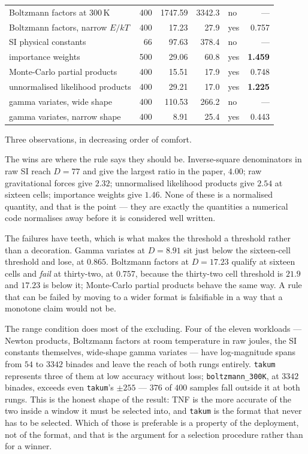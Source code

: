\begin{table}[htbp]
\begin{tabular}{lrrrlr}
Boltzmann factors at $300$\,K & 400 & 1747.59 & 3342.3 & no & --- \\
Boltzmann factors, narrow $E/kT$ & 400 & 17.23 & 27.9 & yes & 0.757 \\
SI physical constants & 66 & 97.63 & 378.4 & no & --- \\
importance weights & 500 & 29.06 & 60.8 & yes & \textbf{1.459} \\
Monte-Carlo partial products & 400 & 15.51 & 17.9 & yes & 0.748 \\
unnormalised likelihood products & 400 & 29.21 & 17.0 & yes & \textbf{1.225} \\
gamma variates, wide shape & 400 & 110.53 & 266.2 & no & --- \\
gamma variates, narrow shape & 400 & 8.91 & 25.4 & yes & 0.443 \\
\hline
\end{tabular}
\end{table}

Three observations, in decreasing order of comfort.

The wins are where the rule says they should be. Inverse-square denominators in
raw SI reach $D = 77$ and give the largest ratio in the paper, $4.00$; raw
gravitational forces give $2.32$; unnormalised likelihood products give $2.54$ at
sixteen cells; importance weights give $1.46$. None of these is a normalised
quantity, and that is the point --- they are exactly the quantities a numerical
code normalises away before it is considered well written.

The failures have teeth, which is what makes the threshold a threshold rather
than a decoration. Gamma variates at $D = 8.91$ sit just below the sixteen-cell
threshold and lose, at $0.865$. Boltzmann factors at $D = 17.23$ qualify at
sixteen cells and \emph{fail} at thirty-two, at $0.757$, because the thirty-two
cell threshold is $21.9$ and $17.23$ is below it; Monte-Carlo partial products
behave the same way. A rule that can be failed by moving to a wider format is
falsifiable in a way that a monotone claim would not be.

The range condition does most of the excluding. Four of the eleven workloads ---
Newton products, Boltzmann factors at room temperature in raw joules, the SI
constants themselves, wide-shape gamma variates --- have log-magnitude spans from
$54$ to $3342$ binades and leave the reach of both rungs entirely.
\texttt{takum} represents three of them at low accuracy without loss;
\texttt{boltzmann\_300K}, at $3342$ binades, exceeds even \texttt{takum}'s
$\pm 255$ --- $376$ of $400$ samples fall outside it at both rungs. This is
the honest shape of the result: TNF is the more accurate of the two inside a
window it must be selected into, and \texttt{takum} is the format that never has
to be selected. Which of those is preferable is a property of the deployment, not
of the format, and that is the argument for a selection procedure rather than for
a winner.


